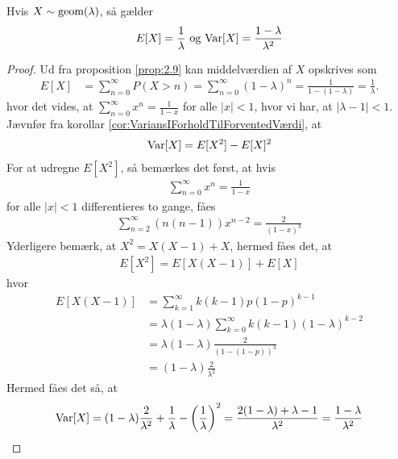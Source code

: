 \begin{prop} %
\label{prop:geomEgenskaber}
Hvis $X \sim \textnormal{geom} (\lambda)$, så gælder 
\begin{align*}
    E[X] = \frac{1}{\lambda} \text{ og } \textnormal{Var}[X] = \frac{1-\lambda}{\lambda^2}
\end{align*}
\end{prop}

\begin{proof}
    Ud fra proposition \ref{prop:2.9} kan middelværdien af $X$ opskrives som
    \begin{align*}
      E[X] &= \sum_{n=0}^{\infty} P(X > n) =\sum_{n=0}^\infty(1-\lambda)^n=\frac{1}{1-(1-\lambda)}=\frac{1}{\lambda}.
    \end{align*}
    hvor det vides, at $\sum_{n=0}^\infty x^n=\frac{1}{1-x}$ for alle $|x|<1$, hvor vi har, at $|\lambda-1|<1$.\\
    Jævnfør fra korollar \ref{cor:VariansIForholdTilForventedVærdi}, at
    \begin{align*}
        \textnormal{Var}[X] =E[X^2]-E[X]^2
    \end{align*}    
    For at udregne $E[X^2]$, så bemærkes det først, at hvis
    \begin{align*}
        \sum^\infty_{n=0}x^n=\frac{1}{1-x}
    \end{align*}
    for alle $|x|<1$ differentieres to gange, fåes 
    \begin{align*}
        \sum^\infty_{n=2}(n(n-1))x^{n-2}=\frac{2}{(1-x)^3}
    \end{align*}
    Yderligere bemærk, at $X^2=X(X-1)+X$, hermed fåes det, at
    \begin{align*}
        E[X^2]=E[X(X-1)]+E[X]
    \end{align*}
    hvor 
    \begin{align*}
        E[X(X-1)]&= \sum_{k=1}^{\infty}k(k-1)p(1-p)^{k-1}\\
        &= \lambda(1-\lambda)\sum_{k=0}^{\infty}k(k-1)(1-\lambda)^{k-2}\\
        &=\lambda(1-\lambda)\frac{2}{(1-(1-p))^3}
        \\
        &=(1-\lambda)\frac{2}{\lambda^2}
    \end{align*}
    Hermed fåes det så, at
    \begin{align*}
        \textnormal{Var}[X]=(1-\lambda)\frac{2}{\lambda^2}+\frac{1}{\lambda}-\left(\frac{1}{\lambda}\right)^2
        =\frac{2(1-\lambda)+\lambda-1}{\lambda^2}
        =\frac{1-\lambda}{\lambda^2}
    \end{align*}

\end{proof}
